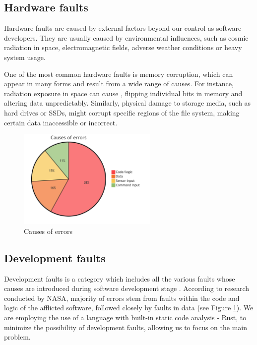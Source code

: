 \subsection{Hardware faults}

Hardware faults \cite{1335465} are caused by external factors beyond our control as software developers. They are usually caused by environmental influences, such as cosmic radiation in space, electromagnetic fields, adverse weather conditions or heavy system usage.

One of the most common hardware faults is memory corruption, which can appear in many forms and result from a wide range of causes. For instance, radiation exposure in space can cause , flipping individual bits in memory and altering data unpredictably. Similarly, physical damage to storage media, such as hard drives or SSDs, might corrupt specific regions of the file system, making certain data inaccessible or incorrect.


\begin{figure}[!hbt]
    \centering
    \includegraphics[width=0.6\textwidth]{diagrams/stats/piechart.png}
    \caption{Causes of errors \cite{nasa:stats}}
    \label{fig:nasa_stats}
\end{figure}

\subsection{Development faults}

Development faults is a category which includes all the various faults whose causes are introduced during software development stage \cite{1335465}. According to research conducted by NASA, majority of errors stem from faults within the code and logic of the afflicted software, followed closely by faults in data \cite{nasa:stats} (see Figure \ref{fig:nasa_stats}).
We are employing the use of a language with built-in static code analysis - Rust, to minimize the possibility of development faults, allowing us to focus on the main problem. 

